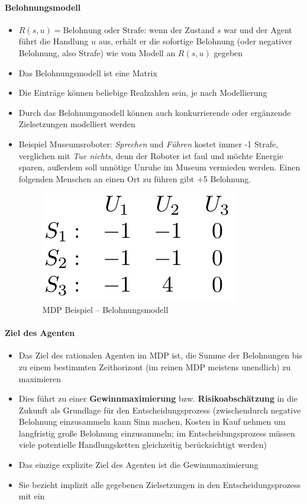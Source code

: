 \paragraph{Belohnungsmodell}
\begin{itemize}
	\item $R(s,u) = \text{Belohnung oder Strafe}$: wenn der Zustand $s$ war und der Agent f\"uhrt die Handlung $u$ aus, erh\"alt er die sofortige Belohnung (oder negativer Belohnung, also Strafe) wie vom Modell an $R(s,u)$ gegeben
	\item Das Belohnungsmodell ist eine Matrix
	\item Die Eintr\"age k\"onnen beliebige Realzahlen sein, je nach Modellierung
	\item Durch das Belohnungsmodell k\"onnen auch konkurrierende oder erg\"anzende Zielsetzungen modelliert werden
	\item Beispiel Museumsroboter: \textit{Sprechen} und \textit{Führen} kostet immer -1 Strafe, verglichen mit \textit{Tue nichts}, denn der Roboter ist faul und möchte Energie sparen, außerdem soll unnötige Unruhe im Museum vermieden werden. Einen folgenden Menschen an einen Ort zu führen gibt +5 Belohnung.
	\begin{figure}[!h]
		\centering
  		\includegraphics[width=0.2\linewidth]{figures/ch07_belmodel-bsp.png}
		\caption{MDP Beispiel -- Belohnungsmodell}
		\label{fig:ch07:belmodel-bsp}
	\end{figure}
\end{itemize}

\paragraph{Ziel des Agenten}
\begin{itemize}
	\item Das Ziel des rationalen Agenten im MDP ist, die Summe der Belohnungen bis zu einem bestimmten Zeithorizont (im reinen MDP meistens unendlich) zu maximieren
	\item Dies f\"uhrt zu einer \textbf{Gewinnmaximierung} bzw. \textbf{Risikoabsch\"atzung} in die Zukunft als Grundlage f\"ur den Entscheidungsprozess (zwischendurch negative Belohnung einzusammeln kann Sinn machen, Kosten in Kauf nehmen um langfristig große Belohnung einzusammeln; im Entscheidungsprozess müssen viele potentielle Handlungsketten gleichzeitig berücksichtigt werden)
	\item Das einzige explizite Ziel des Agenten ist die Gewinnmaximierung
	\item Sie bezieht implizit alle gegebenen Zielsetzungen in den Entscheidungsprozess mit ein
\end{itemize}

